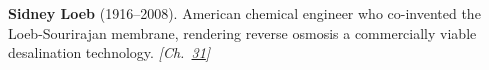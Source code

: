 \textbf{Sidney Loeb} (1916–2008). American chemical engineer who co-invented the Loeb-Sourirajan membrane, rendering reverse osmosis a commercially viable desalination technology. \emph{[Ch.~\hyperref[ch:osmosisdebye]{31}]}

